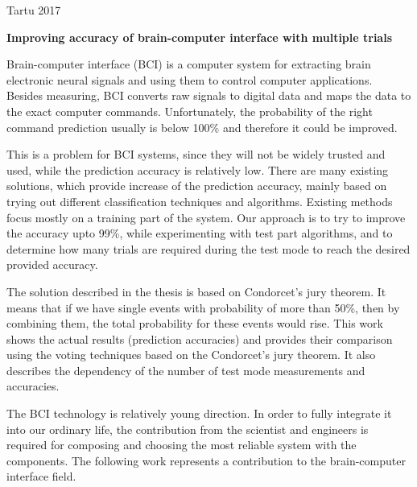 \documentclass[12pt]{article}
\begin{document}
\vfill
\centerline{Tartu 2017}



\newpage
{}
\noindent\textbf{\large Improving accuracy of brain-computer interface with multiple trials}
\vspace*{2ex}
{ }

Brain-computer interface (BCI) is a computer system for extracting brain electronic neural signals and using them to control computer applications. Besides measuring, BCI converts raw signals to digital data and maps the data to the exact computer commands. Unfortunately, the probability of the right command prediction usually is below 100\% and therefore it could be improved.

This is a problem for BCI systems, since they will not be widely trusted and used, while the prediction accuracy is relatively low. There are many existing solutions, which provide increase of the prediction accuracy, mainly based on trying out different classification techniques and algorithms. Existing methods focus mostly on a training part of the system. Our approach is to try to improve the accuracy upto 99\%, while experimenting with test part algorithms, and to determine how many trials are required during the test mode to reach the desired provided accuracy.

The solution described in the thesis is based on Condorcet's jury theorem. It means that if we have single events with probability of more than 50\%, then by combining them, the total probability for these events would rise. This work shows the actual results (prediction accuracies) and provides their comparison using the voting techniques based on the Condorcet's jury theorem. It also describes the dependency of the number of test mode measurements and accuracies.

The BCI technology is relatively young direction. In order to fully integrate it into our ordinary life, the contribution from the scientist and engineers is required for composing and choosing the most reliable system with the components. The following work represents a contribution to the brain-computer interface field.
\end{document}
